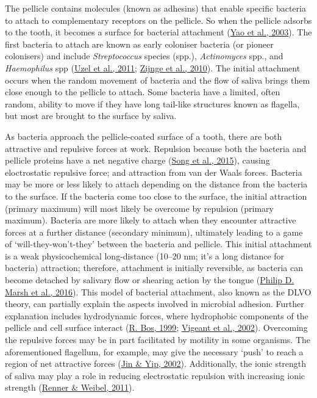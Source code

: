 \documentclass[
  letterpaper,
]{book}
\begin{document}
The pellicle contains molecules (known as adhesins) that enable specific
bacteria to attach to complementary receptors on the pellicle. So when
the pellicle adsorbs to the tooth, it becomes a surface for bacterial
attachment (\protect\hyperlink{ref-yaoIdentificationProtein2003}{Yao et
al., 2003}). The first bacteria to attach are known as early coloniser
bacteria (or pioneer colonisers) and include \emph{Streptococcus}
species (spp.), \emph{Actinomyces} spp., and \emph{Haemophilus} spp
(\protect\hyperlink{ref-uzelMicrobialShifts2011}{Uzel et al., 2011};
\protect\hyperlink{ref-zijngeBiofilmArchitecture2010}{Zijnge et al.,
2010}). The initial attachment occurs when the random movement of
bacteria and the flow of saliva brings them close enough to the pellicle
to attach. Some bacteria have a limited, often random, ability to move
if they have long tail-like structures known as flagella, but most are
brought to the surface by saliva.

As bacteria approach the pellicle-coated surface of a tooth, there are
both attractive and repulsive forces at work. Repulsion because both the
bacteria and pellicle proteins have a net negative charge
(\protect\hyperlink{ref-songEffectsMaterial2015}{Song et al., 2015}),
causing eloctrostatic repulsive force; and attraction from van der Waals
forces. Bacteria may be more or less likely to attach depending on the
distance from the bacteria to the surface. If the bacteria come too
close to the surface, the initial attraction (primary maximum) will most
likely be overcome by repulsion (primary maximum). Bacteria are more
likely to attach when they encounter attractive forces at a further
distance (secondary minimum), ultimately leading to a game of
`will-they-won't-they' between the bacteria and pellicle. This initial
attachment is a weak physicochemical long-distance (10--20 nm; it's a
long distance for bacteria) attraction; therefore, attachment is
initially reversible, as bacteria can become detached by salivary flow
or shearing action by the tongue
(\protect\hyperlink{ref-marshDentalPlaque2016}{Philip D. Marsh et al.,
2016}). This model of bacterial attachment, also known as the DLVO
theory, can partially explain the aspects involved in microbial
adhesion. Further explanation includes hydrodynamic forces, where
hydrophobic components of the pellicle and cell surface interact
(\protect\hyperlink{ref-bosPhysicochemistryInitial1999}{R. Bos, 1999};
\protect\hyperlink{ref-vigeantReversibleIrreversible2002}{Vigeant et
al., 2002}). Overcoming the repulsive forces may be in part facilitated
by motility in some organisms. The aforementioned flagellum, for
example, may give the necessary `push' to reach a region of net
attractive forces
(\protect\hyperlink{ref-jinSupragingivalCalculus2002}{Jin \& Yip,
2002}). Additionally, the ionic strength of saliva may play a role in
reducing electrostatic repulsion with increasing ionic strength
(\protect\hyperlink{ref-rennerPhysicochemicalRegulation2011}{Renner \&
Weibel, 2011}).
\end{document}
